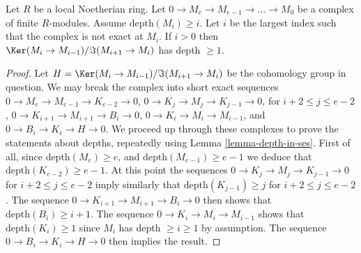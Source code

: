 \begin{lemma}
\label{lemma-acyclic}
\begin{reference}
\cite[Lemma 1.8]{Peskine-Szpiro}
\end{reference}
Let $R$ be a local Noetherian ring.
Let $0 \to M_e \to M_{e-1} \to \ldots \to M_0$
be a complex of finite $R$-modules.
Assume $\text{depth}(M_i) \geq i$.
Let $i$ be the largest index such that the complex is
not exact at $M_i$. If $i > 0$ then
$\Ker(M_i \to M_{i-1})/\Im(M_{i + 1} \to M_i)$
has depth $\geq 1$.
\end{lemma}

\begin{proof}
Let $H = \Ker(M_i \to M_{i-1})/\Im(M_{i + 1} \to M_i)$ be the
cohomology group in question.
We may break the complex into short exact sequences
$0 \to M_e \to M_{e-1} \to K_{e-2} \to 0$,
$0 \to K_j \to M_j \to K_{j-1} \to 0$, for $i + 2 \leq j \leq e-2 $,
$0 \to K_{i + 1} \to M_{i + 1} \to B_i \to 0$,
$0 \to K_i \to M_i \to M_{i-1}$, and
$0 \to B_i \to K_i \to H \to 0$.
We proceed up through these complexes to
prove the statements about depths, repeatedly using
Lemma \ref{lemma-depth-in-ses}.
First of all, since $\text{depth}(M_e) \geq e$,
and $\text{depth}(M_{e-1}) \geq e-1$ we deduce
that $\text{depth}(K_{e-2}) \geq e - 1$. At this point the
sequences $0 \to K_j \to M_j \to K_{j-1} \to 0$ for $i + 2 \leq j \leq e-2 $
imply similarly that $\text{depth}(K_{j-1}) \geq j$ for
$i + 2 \leq j \leq e-2$. The sequence
$0 \to K_{i + 1} \to M_{i + 1} \to B_i \to 0$
then shows that $\text{depth}(B_i) \geq i + 1$. The sequence
$0 \to K_i \to M_i \to M_{i-1}$ shows that $\text{depth}(K_i) \geq 1$
since $M_i$ has depth $\geq i \geq 1$ by assumption.
The sequence $0 \to B_i \to K_i \to H \to 0$ then
implies the result.
\end{proof}
